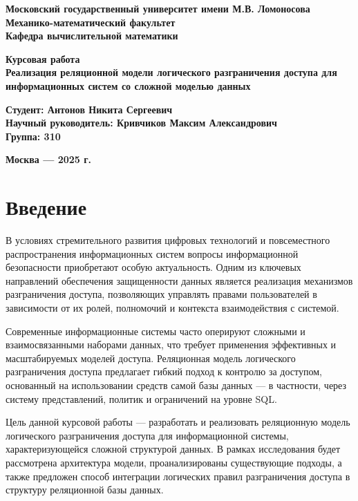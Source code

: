 \documentclass[14pt, a4paper]{extarticle}
\begin{document}
\begin{titlepage}
    \centering
    {\bfseries Московский государственный университет имени М.В. Ломоносова\\
    Механико-математический факультет\\
    Кафедра вычислительной математики
    }
    
    \vfill

    {\LARGE\bfseries Курсовая работа\\[1ex]
    Реализация реляционной модели логического разграничения доступа для информационных систем со сложной моделью данных}

    \vfill

    {\bfseries
    Студент: Антонов Никита Сергеевич\\[0.5ex]
    Научный руководитель: Кривчиков Максим Александрович\\[0.5ex]
    Группа: 310
    }

    \vfill

    {\bfseries Москва — 2025 г.}
\end{titlepage}

\tableofcontents
\newpage

\section*{Введение}

В условиях стремительного развития цифровых технологий и повсеместного распространения информационных систем вопросы информационной безопасности приобретают особую актуальность. Одним из ключевых направлений обеспечения защищенности данных является реализация механизмов разграничения доступа, позволяющих управлять правами пользователей в зависимости от их ролей, полномочий и контекста взаимодействия с системой.

Современные информационные системы часто оперируют сложными и взаимосвязанными наборами данных, что требует применения эффективных и масштабируемых моделей доступа. Реляционная модель логического разграничения доступа предлагает гибкий подход к контролю за доступом, основанный на использовании средств самой базы данных — в частности, через систему представлений, политик и ограничений на уровне SQL.

Цель данной курсовой работы — разработать и реализовать реляционную модель логического разграничения доступа для информационной системы, характеризующейся сложной структурой данных. В рамках исследования будет рассмотрена архитектура модели, проанализированы существующие подходы, а также предложен способ интеграции логических правил разграничения доступа в структуру реляционной базы данных.
\end{document}
